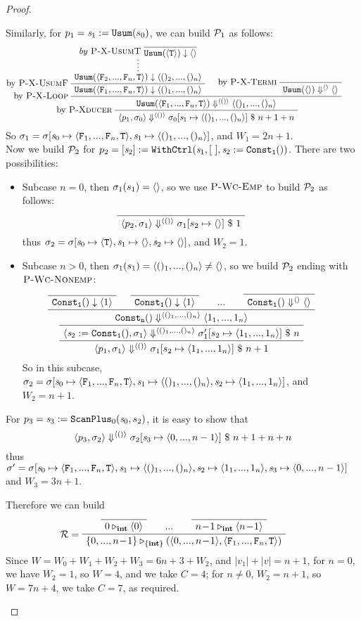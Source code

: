 \begin{proof}
\begin{itemize}
	 Similarly, for $p_1 = \sdef{\s_1}{\usum(s_0)}$, we can build $\MP_1$ as follows:
	 $$\PT{
	 	\AC{ \infer*{\blockf{\usum}{\<\F_2,...,\F_n,\T\'>}{\< ()_2,...,()_n\'>}} 
	 		{by \ \PName{X-UsumT} \  \vcenter{\infer {\blockf{\usum}{\singl{\T}}{\emptyv}}{}}}
	 	}
	 	\LeftLabel{by \PName{X-UsumF}}
	 	\UC{\blockf{\usum}{\flagn}{\nunit}}
	 	\AC{}
	 	\LeftLabel{by \PName{X-Termi}}
	 	\UC{\sevalfg{\usum}{\emptyv}{\emptyv} \emptyv}
	 	\LeftLabel{by \PName{X-Loop}}
	 	\BC{\sevalfg{\usum}{\flagn}{\vunit}{\nunit}}
	 	\LeftLabel{by \PName{Xducer}}
	 	\UC{\seval{p_1}{\sgm_0}{\vunit}{\sgm_0[\s_1 \|-> \nunit]}{n+1+n}}
	 }$$
	 So $\sgm_1 = \sgm[\s_0 \|-> \flagn, \s_1 \|-> \nunit]$, and $W_1 = 2n+1$. \\
	 
	 Now we build $\MP_2$ for $p_2 = \withctrl{\s_1}{\sdef{\s_2}{\consta{1}()}}{[ \ ]}{[\s_2]}$. There are two possibilities: 
	 
	 \begin{itemize}
	 	\item Subcase $n=0$, then $\sgm_1(s_1) = \emptyv$, so we use $\PName{Wc-Emp}$ to build $\MP_2$ as follows:	 	
	 	$$\PT{\Axiom{\seval{p_2}{\sgm_1}{\vunit}{\sgm_1[s_2 \|-> \emptyv]}{1}}}$$
	 	thus $\sgm_2 = \sgm[\s_0 \|-> \oT, \s_1 \|-> \emptyv, \s_2 \|-> \emptyv]$, and $W_2 = 1$. 
	 	
		\item Subcase $n >0$, then $\sgm_1(s_1) = \nunit \neq \emptyv$, so we build $\MP_2$ ending with $\PName{Wc-Nonemp}$:
		$$\PT{
			\Axiom{\blockf{\consta{1}}{}{\singl{1}}}
			\Axiom{\blockf{\consta{1}}{}{\singl{1}}}
			\AC{...}
			\Axiom{\sevalfg{\consta{1}}{}{\emptyv}{\emptyv}}
			\QuaternaryInfC{$\sevalfg{\consta{n}}{}{\nunit}{\<1_1,...,1_n\'>}$}
			\UC{\seval{\sdef{\s_2}{\consta{1}()}}{\sgm_1}{\nunit}
				{\sgm'_1[s_2 \|-> \<1_1,...,1_n\'>]}{n}}
			\UC{\seval{p_1}{\sgm_1}{\vunit}{\sgm_1[s_2 \|-> \<1_1,...,1_n\'>]}{n+1}}}$$
	 	So in this subcase, $\sgm_2 = \sgm[\s_0 \|-> \flagn, \s_1 \|-> \nunit, \s_2 \|-> \<1_1,...,1_n\'>]$, and $W_2 = n+1$.
	 \end{itemize}

	 For $p_3 = \sdef{\s_3}{\scan_{0}(\s_0,s_2)}$, it is easy to show that 
	 $$\seval{p_3}{\sgm_2}{\vunit}{\sgm_2[\s_3 \|-> \<0,...,n-1\'>]}{n+1+n+n}$$ 
	 thus $\sgm' = \sgm[\s_0 \|-> \flagn, \s_1 \|-> \nunit, \s_2 \|-> \<1_1,...,1_n\'>, \s_3 \|-> \<0,...,n-1\'>]$ 
	 and $W_3= 3n+1$. 
	 
	 Therefore we can build 
	 $$\PT{
	 	\Axiom{\ValRep{0}{\int}{\singl{0}}}
	 	\AC{...}
	 	\Axiom{\ValRep{n\!-\!1}{\int}{\singl{n\!-\!1}}}
	 	\LeLa{\MR =}
	 	\TC{\ValRep{\{0,...,n\!-\!1\}}{\tseq{\int}}{(\<0,...,n\!-\!1\'>,\flagn)}}
	 }$$
	 Since $W = W_0+W_1+W_2+W_3 = 6n+3 + W_2$, and $|v_1|+|v| = n+1$,
     for $n=0$, we have $W_2=1$, so $W = 4 $, and we take $C = 4$;
     for $n \neq 0$, $W_2 = n+1$, so $W= 7n+4$,  we take $C=7$, as required.
	 	
	
\end{itemize}
\end{proof}


